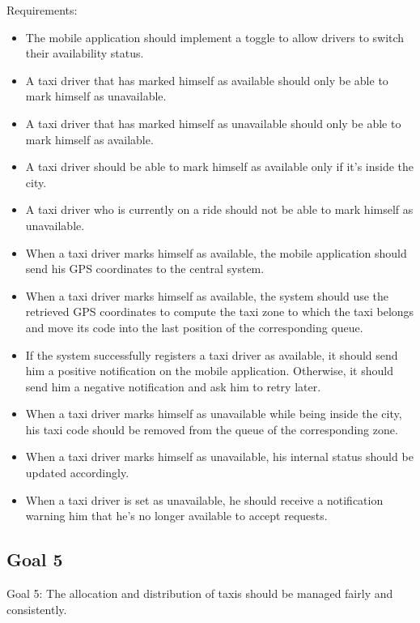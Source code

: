 Requirements:
\begin{itemize}
\item The mobile application should implement a toggle to allow drivers to switch their availability status.
\item A taxi driver that has marked himself as available should only be able to mark himself as unavailable. 
\item A taxi driver that has marked himself as unavailable should only be able to mark himself as available. 
\item A taxi driver should be able to mark himself as available only if it’s inside the city. 
\item A taxi driver who is currently on a ride should not be able to mark himself as unavailable. 
\item When a taxi driver marks himself as available, the mobile application should send his GPS coordinates to the central system.
\item When a taxi driver marks himself as available, the system should use the retrieved GPS coordinates to compute the taxi zone to which the taxi belongs and move its code into the last position of the corresponding queue. 
\item If the system successfully registers a taxi driver as available, it should send him a positive notification on the mobile application. Otherwise, it should send him a negative notification and ask him to retry later.
\item When a taxi driver marks himself as unavailable while being inside the city, his taxi code should be removed from the queue of the corresponding zone.
\item When a taxi driver marks himself as unavailable, his internal status should be updated accordingly. 
\item When a taxi driver is set as unavailable, he should receive a notification warning him that he’s no longer available to accept requests.
\end{itemize}

\subsection{Goal 5}
Goal 5: The allocation and distribution of taxis should be managed fairly and consistently.

